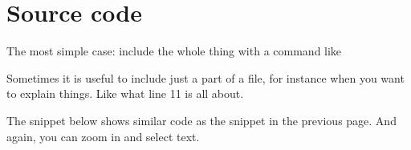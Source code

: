 \section{Source code}
The most simple case: include the whole thing with a command like \\
\verb##


Sometimes it is useful to include just a part of a file, for instance
when you want to explain things. Like what line 11 is all about.\\
\verb##



The snippet below shows similar code as the snippet in the previous page.
And again, you can zoom in and select text.







